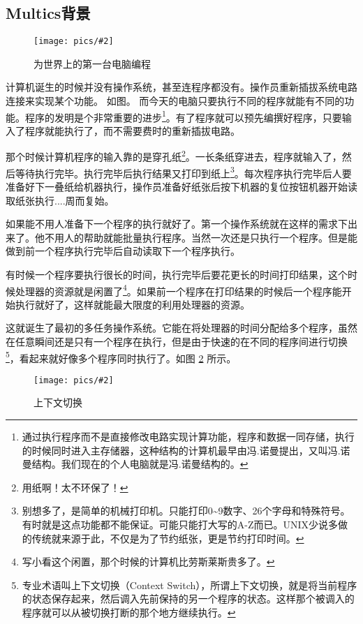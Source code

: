\documentclass[amstex]{ctexbook}
\newenvironment{insertnote}{ \ttfamily\CJKfamily{KaiTi} }{\vskip 1cm }
\newcommand{\chatu}[3][0.35]{%
\begin{figure}[h]%
\centering%
\texttt{[image: pics/\#2]}%
\caption{#3\label{fig:#2}}%
\end{figure}%
}
\begin{document}
\begin{insertnote}
\subsection*{Multics背景}

\chatu{TwoWomenOperatingENIAC}{为世界上的第一台电脑编程\protect\footnotemark}%


计算机诞生的时候并没有操作系统，甚至连程序都没有。操作员重新插拔系统电路连接来实现某个功能。
如图。
而今天的电脑只要执行不同的程序就能有不同的功能。程序的发明是个非常重要的进步\footnote{通过执行程序而不是直接修改电路实现计算功能，程序和数据一同存储，执行的时候同时进入主存储器，这种结构的计算机最早由冯.诺曼提出，又叫冯.诺曼结构。我们现在的个人电脑就是冯.诺曼结构的。}。有了程序就可以预先编撰好程序，只要输入了程序就能执行了，而不需要费时的重新插拔电路。

那个时候计算机程序的输入靠的是穿孔纸\footnote{用纸啊！太不环保了！}。一长条纸穿进去，程序就输入了，然后等待执行完毕。执行完毕后执行结果又打印到纸上\footnote{别想多了，是简单的机械打印机。只能打印0\textasciitilde{}9数字、26个字母和特殊符号。有时就是这点功能都不能保证。可能只能打大写的A-Z而已。UNIX少说多做的传统就来源于此，不仅是为了节约纸张，更是节约打印时间。}。每次程序执行完毕后人要准备好下一叠纸给机器执行，操作员准备好纸张后按下机器的复位按钮机器开始读取纸张执行....周而复始。

如果能不用人准备下一个程序的执行就好了。第一个操作系统就在这样的需求下出来了。他不用人的帮助就能批量执行程序。当然一次还是只执行一个程序。但是能做到前一个程序执行完毕后自动读取下一个程序执行。

有时候一个程序要执行很长的时间，执行完毕后要花更长的时间打印结果，这个时候处理器的资源就是闲置了\footnote{写小看这个闲置，那个时候的计算机比劳斯莱斯贵多了。}。如果前一个程序在打印结果的时候后一个程序能开始执行就好了，这样就能最大限度的利用处理器的资源。


这就诞生了最初的多任务操作系统。它能在将处理器的时间分配给多个程序，虽然在任意瞬间还是只有一个程序在执行，但是由于快速的在不同的程序间进行切换\footnote{专业术语叫上下文切换（Context Switch），所谓上下文切换，就是将当前程序的状态保存起来，然后调入先前保持的另一个程序的状态。这样那个被调入的程序就可以从被切换打断的那个地方继续执行。}，看起来就好像多个程序同时执行了。如图 \ref{fig:ContextSwitch}  所示。

\chatu[0.65]{ContextSwitch}{上下文切换}


\end{insertnote}
\end{document}
